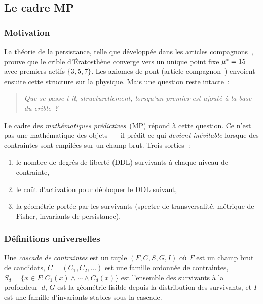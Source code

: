 \documentclass[12pt,a4paper]{article}
\begin{document}
\subsection{Le cadre MP}
\label{sec:PM_framework}

\subsubsection{Motivation}
\mTHM

La théorie de la persistance, telle que développée dans les articles
compagnons~\cite{companion_M1,companion_M2,companion_M3}, prouve que
le crible d'Ératosthène converge vers un unique point fixe
${\mu^{*}} = 15$ avec premiers actifs $\{3, 5, 7\}$. Les axiomes de
pont (article compagnon~\cite{companion_M5}) envoient ensuite cette
structure sur la physique. Mais une question reste intacte~:

\begin{quote}
\emph{Que se passe-t-il, structurellement, lorsqu'un premier est
ajouté à la base du crible~?}
\end{quote}

Le cadre des \emph{mathématiques prédictives}~(MP) répond à cette
question. Ce n'est pas une mathématique des objets~--- il prédit ce
qui \emph{devient inévitable} lorsque des contraintes sont empilées
sur un champ brut. Trois sorties~:
\begin{enumerate}[nosep]
  \item le nombre de degrés de liberté (DDL) survivants à chaque
    niveau de contrainte,
  \item le coût d'activation pour débloquer le DDL suivant,
  \item la géométrie portée par les survivants (spectre de
    transversalité, métrique de Fisher, invariants de persistance).
\end{enumerate}

\subsubsection{Définitions universelles}
\label{sec:PM_defs}

\begin{definition}
\label{def:cascade}
Une \emph{cascade de contraintes} est un tuple $(F, C, S, G, I)$ où
$F$ est un champ brut de candidats,
$C = (C_1, C_2, \ldots)$ est une famille ordonnée de contraintes,
$S_d = \{x \in F : C_1(x) \wedge \cdots \wedge C_d(x)\}$ est
l'ensemble des survivants à la profondeur~$d$,
$G$ est la géométrie lisible depuis la distribution des survivants,
et $I$ est une famille d'invariants stables sous la cascade.
\end{definition}
\end{document}
